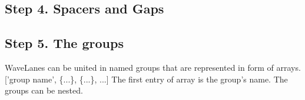 \documentclass{article}
\begin{document}
\subsection{Step 4. Spacers and Gaps}



\begin{tikzpicture}[thick]
    
\end{tikzpicture}


\subsection{Step 5. The groups}
WaveLanes can be united in named groups that are represented in form of arrays. 
['group name', \{...\}, \{...\}, ...] The first entry of array is the group's name. The groups can be nested. 



\begin{tikzpicture}[thick]
    
\end{tikzpicture}
\end{document}
